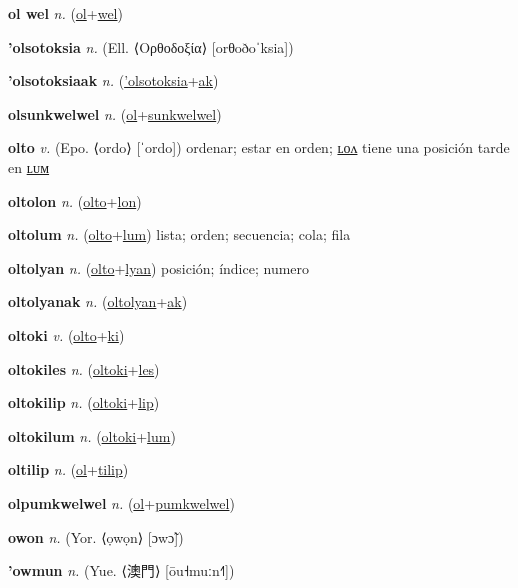 \textbf{\hypertarget{ol wel}{ol wel}} \textit{n.} (\hyperlink{ol}{ol}+\allowbreak \hyperlink{wel}{wel})


\textbf{\hypertarget{'olsotoksia}{'olsotoksia}} \textit{n.} (Ell. ⟨Ορθοδοξία⟩ [orθoðoˈksia])


\textbf{\hypertarget{'olsotoksiaak}{'olsotoksiaak}} \textit{n.} (\hyperlink{'olsotoksia}{'olsotoksia}+\allowbreak \hyperlink{ak}{ak})


\textbf{\hypertarget{olsunkwelwel}{olsunkwelwel}} \textit{n.} (\hyperlink{ol}{ol}+\allowbreak \hyperlink{sunkwelwel}{sunkwelwel})


\textbf{\hypertarget{olto}{olto}} \textit{v.} (Epo. ⟨ordo⟩ [ˈordo])
ordenar; estar en orden; \hyperlink{oltolon}{ʟᴏᴧ} tiene una posición tarde en \hyperlink{oltolum}{ʟᴜᴍ}

\textbf{\hypertarget{oltolon}{oltolon}} \textit{n.} (\hyperlink{olto}{olto}+\allowbreak \hyperlink{lon}{lon})


\textbf{\hypertarget{oltolum}{oltolum}} \textit{n.} (\hyperlink{olto}{olto}+\allowbreak \hyperlink{lum}{lum})
lista; orden; secuencia; cola; fila

\textbf{\hypertarget{oltolyan}{oltolyan}} \textit{n.} (\hyperlink{olto}{olto}+\allowbreak \hyperlink{lyan}{lyan})
posición; índice; numero

\textbf{\hypertarget{oltolyanak}{oltolyanak}} \textit{n.} (\hyperlink{oltolyan}{oltolyan}+\allowbreak \hyperlink{ak}{ak})


\textbf{\hypertarget{oltoki}{oltoki}} \textit{v.} (\hyperlink{olto}{olto}+\allowbreak \hyperlink{ki}{ki})


\textbf{\hypertarget{oltokiles}{oltokiles}} \textit{n.} (\hyperlink{oltoki}{oltoki}+\allowbreak \hyperlink{les}{les})


\textbf{\hypertarget{oltokilip}{oltokilip}} \textit{n.} (\hyperlink{oltoki}{oltoki}+\allowbreak \hyperlink{lip}{lip})


\textbf{\hypertarget{oltokilum}{oltokilum}} \textit{n.} (\hyperlink{oltoki}{oltoki}+\allowbreak \hyperlink{lum}{lum})


\textbf{\hypertarget{oltilip}{oltilip}} \textit{n.} (\hyperlink{ol}{ol}+\allowbreak \hyperlink{tilip}{tilip})


\textbf{\hypertarget{olpumkwelwel}{olpumkwelwel}} \textit{n.} (\hyperlink{ol}{ol}+\allowbreak \hyperlink{pumkwelwel}{pumkwelwel})


\textbf{\hypertarget{owon}{owon}} \textit{n.} (Yor. ⟨ọwọn⟩ [ɔwɔ̃])


\textbf{\hypertarget{'owmun}{'owmun}} \textit{n.} (Yue. ⟨{\chinese{}澳門}⟩ [ōu˧muːn˧˥])


